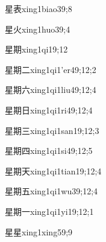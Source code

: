 \begin{verbete}{星表}{xing1biao3}{9;8}
\end{verbete}

\begin{verbete}{星火}{xing1huo3}{9;4}
\end{verbete}

\begin{verbete}{星期}{xing1qi1}{9;12}
\end{verbete}

\begin{verbete}{星期二}{xing1qi1'er4}{9;12;2}
\end{verbete}

\begin{verbete}{星期六}{xing1qi1liu4}{9;12;4}
\end{verbete}

\begin{verbete}{星期日}{xing1qi1ri4}{9;12;4}
\end{verbete}

\begin{verbete}{星期三}{xing1qi1san1}{9;12;3}
\end{verbete}

\begin{verbete}{星期四}{xing1qi1si4}{9;12;5}
\end{verbete}

\begin{verbete}{星期天}{xing1qi1tian1}{9;12;4}
\end{verbete}

\begin{verbete}{星期五}{xing1qi1wu3}{9;12;4}
\end{verbete}

\begin{verbete}{星期一}{xing1qi1yi1}{9;12;1}
\end{verbete}

\begin{verbete}{星星}{xing1xing5}{9;9}
\end{verbete}

